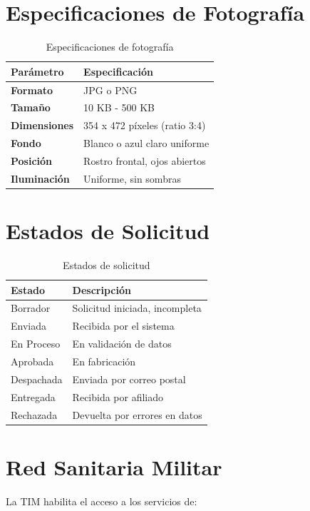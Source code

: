 \section{Especificaciones de Fotografía}

\begin{longtable}{p{4cm}p{8cm}}
\toprule
\textbf{Parámetro} & \textbf{Especificación} \\
\midrule
\endhead
\bottomrule
\caption{Especificaciones de fotografía}
\label{tab:foto}
\endlastfoot

\textbf{Formato} & JPG o PNG \\
\textbf{Tamaño} & 10 KB - 500 KB \\
\textbf{Dimensiones} & 354 x 472 píxeles (ratio 3:4) \\
\textbf{Fondo} & Blanco o azul claro uniforme \\
\textbf{Posición} & Rostro frontal, ojos abiertos \\
\textbf{Iluminación} & Uniforme, sin sombras \\
\end{longtable}

\section{Estados de Solicitud}

\begin{longtable}{p{3cm}p{9cm}}
\toprule
\textbf{Estado} & \textbf{Descripción} \\
\midrule
\endhead
\bottomrule
\caption{Estados de solicitud}
\label{tab:estados}
\endlastfoot

Borrador & Solicitud iniciada, incompleta \\
Enviada & Recibida por el sistema \\
En Proceso & En validación de datos \\
Aprobada & En fabricación \\
Despachada & Enviada por correo postal \\
Entregada & Recibida por afiliado \\
Rechazada & Devuelta por errores en datos \\
\end{longtable}

\section{Red Sanitaria Militar}

La TIM habilita el acceso a los servicios de:

